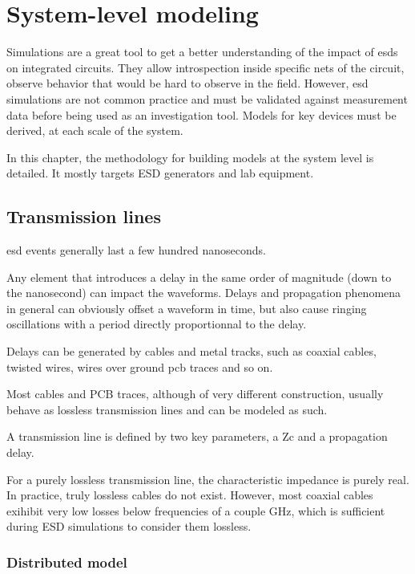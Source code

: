 \section{System-level modeling}

Simulations are a great tool to get a better understanding of the impact of \gls{esd}s on integrated circuits.
They allow introspection inside specific nets of the circuit, observe behavior that would be hard to observe in the field.
However, \gls{esd} simulations are not common practice and must be validated against measurement data before being used as an investigation tool.
Models for key devices must be derived, at each scale of the system.

In this chapter, the methodology for building models at the system level is detailed.
It mostly targets ESD generators and lab equipment.

\subsection{Transmission lines}

\gls{esd} events generally last a few hundred nanoseconds.

Any element that introduces a delay in the same order of magnitude (down to the nanosecond) can impact the waveforms.
Delays and propagation phenomena in general can obviously offset a waveform in time,
but also cause ringing oscillations with a period directly proportionnal to the delay.

Delays can be generated by cables and metal tracks, such as coaxial cables, twisted wires, wires over ground \gls{pcb} traces and so on.

Most cables and PCB traces, although of very different construction, usually behave as lossless transmission lines and can be modeled as such.

A transmission line is defined by two key parameters, a \gls{Zc} and a propagation delay.


For a purely lossless transmission line, the characteristic impedance is purely real.
In practice, truly lossless cables do not exist.
However, most coaxial cables exihibit very low losses below frequencies of a couple GHz, which is sufficient during ESD simulations to consider them lossless.

\subsubsection{Distributed model}


